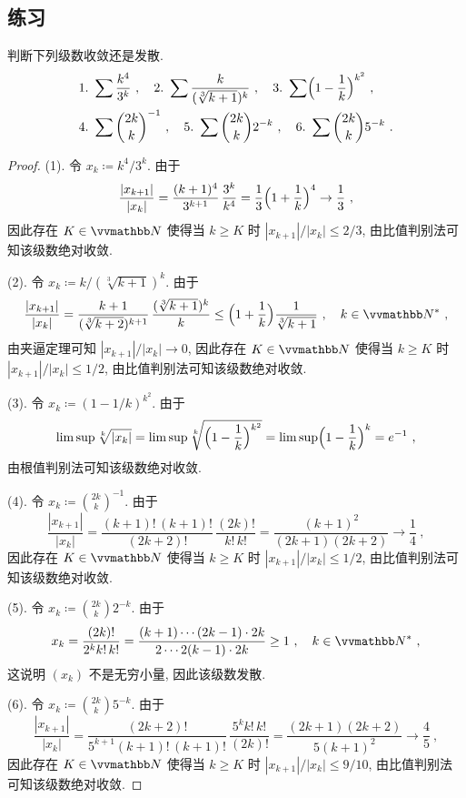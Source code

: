 \subsection{练习}

\begin{exercise}
    判断下列级数收敛还是发散.
    \begin{align*}
        &1.\ \sum \frac{k^4}{3^k}\ ,\quad 2.\ \sum \frac{k}{(\sqrt[3]{k + 1})^k}\ ,\quad 3.\ \sum \Bigl(1 - \frac{1}{k}\Bigr)^{k^2}\ ,\\
        &4.\ \sum \binom{2 k}{k}^{- 1}\ ,\quad 5.\ \sum \binom{2 k}{k} 2^{- k}\ ,\quad 6.\ \sum \binom{2 k}{k} 5^{- k}\ .
    \end{align*}
\end{exercise}

\begin{proof}
    (1). 令 \(x_k \coloneqq k^4 / 3^k\). 由于
    \[
        \frac{|x_{k + 1}|}{|x_k|} = \frac{(k + 1)^4}{3^{k + 1}}\, \frac{3^k}{k^4} = \frac{1}{3} \Bigl(1 + \frac{1}{k}\Bigr)^4 \to \frac{1}{3}\ ,
    \]
    因此存在 \(K \in \N\) 使得当 \(k \geq K\) 时 \(|x_{k + 1}| \big/ |x_k| \leq 2 / 3\), 由比值判别法可知该级数绝对收敛.

    (2). 令 \(x_k \coloneqq k / (\sqrt[3]{k + 1})^k\). 由于
    \[
        \frac{|x_{k + 1}|}{|x_k|} = \frac{k + 1}{(\sqrt[3]{k + 2})^{k + 1}}\, \frac{(\sqrt[3]{k + 1})^k}{k} \leq \Bigl(1 + \frac{1}{k}\Bigr) \frac{1}{\sqrt[3]{k + 1}}\ ,\quad k \in \N^\ast\ ,
    \]
    由夹逼定理可知 \(|x_{k + 1}| \big/ |x_k| \to 0\), 因此存在 \(K \in \N\) 使得当 \(k \geq K\) 时 \(|x_{k + 1}| \big/ |x_k| \leq 1 / 2\), 由比值判别法可知该级数绝对收敛.

    (3). 令 \(x_k \coloneqq (1 - 1 / k)^{k^2}\). 由于
    \[
        \limsup \sqrt[k]{|x_k|} = \limsup \sqrt[k]{\Bigl(1 - \frac{1}{k}\Bigr)^{k^2}} = \limsup \Bigl(1 - \frac{1}{k}\Bigr)^k = e^{- 1}\ ,
    \]
    由根值判别法可知该级数绝对收敛.

    (4). 令 \(x_k \coloneqq \binom{2 k}{k}^{- 1}\). 由于
    \[
        \frac{|x_{k + 1}|}{|x_k|} = \frac{(k + 1)!\, (k + 1)!}{(2 k + 2)!}\, \frac{(2 k)!}{k!\, k!} = \frac{(k + 1)^2}{(2 k + 1) (2 k + 2)} \to \frac{1}{4}\ ,
    \]
    因此存在 \(K \in \N\) 使得当 \(k \geq K\) 时 \(|x_{k + 1}| \big/ |x_k| \leq 1 / 2\), 由比值判别法可知该级数绝对收敛.

    (5). 令 \(x_k \coloneqq \binom{2 k}{k} 2^{- k}\). 由于
    \[
        x_k = \frac{(2 k)!}{2^k k!\, k!} = \frac{(k + 1) \cdots (2 k - 1) \cdot 2 k}{2 \cdots 2 (k - 1) \cdot 2 k} \geq 1\ ,\quad k \in \N^\ast\ ,
    \]
    这说明 \((x_k)\) 不是无穷小量, 因此该级数发散.

    (6). 令 \(x_k \coloneqq \binom{2 k}{k} 5^{- k}\). 由于
    \[
        \frac{|x_{k + 1}|}{|x_k|} = \frac{(2 k + 2)!}{5^{k + 1} (k + 1)!\, (k + 1)!}\, \frac{5^k k!\, k!}{(2 k)!} = \frac{(2 k + 1) (2 k + 2)}{5 (k + 1)^2} \to \frac{4}{5}\ ,
    \]
    因此存在 \(K \in \N\) 使得当 \(k \geq K\) 时 \(|x_{k + 1}| \big/ |x_k| \leq 9 / 10\), 由比值判别法可知该级数绝对收敛.
\end{proof}

